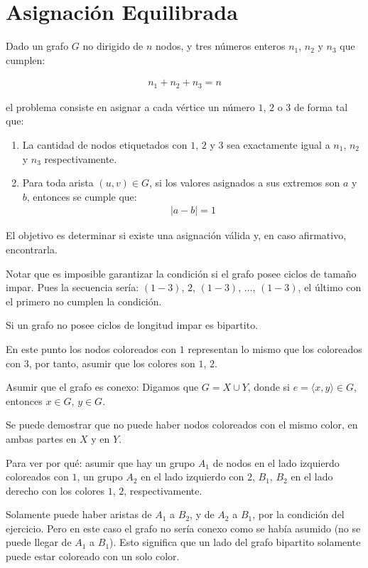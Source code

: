 \documentclass[14pt]{extarticle}
\begin{document}
\section*{Asignación Equilibrada}

Dado un grafo $G$ no dirigido de $n$ nodos, y tres números enteros $n_1$, $n_2$ y $n_3$ que cumplen:

\begin{align}
n_1 + n_2 + n_3 = n
\end{align}

el problema consiste en asignar a cada vértice un número $1$, $2$ o $3$ de forma tal que:

\begin{enumerate}
    \item La cantidad de nodos etiquetados con $1$, $2$ y $3$ sea exactamente igual a $n_1$, $n_2$ y $n_3$ respectivamente.
    \item Para toda arista $(u, v) \in G$, si los valores asignados a sus extremos son $a$ y $b$, entonces se cumple que:
    \begin{align}
    |a - b| = 1
    \end{align}
\end{enumerate}

El objetivo es determinar si existe una asignación válida y, en caso afirmativo, encontrarla.

Notar que es imposible garantizar la condición si el grafo posee ciclos de tamaño impar. Pues la secuencia sería: $(1-3)$, $2$, $(1-3)$, $\ldots$, $(1-3)$, el último con el primero no cumplen la condición.

Si un grafo no posee ciclos de longitud impar es bipartito.

En este punto los nodos coloreados con $1$ representan lo mismo que los coloreados con $3$, por tanto, asumir que los colores son $1$, $2$.

Asumir que el grafo es conexo: Digamos que $G = X \cup Y$, donde si $e = \langle x, y \rangle \in G$, entonces $x \in G$, $y \in G$.

Se puede demostrar que no puede haber nodos coloreados con el mismo color, en ambas partes en $X$ y en $Y$. 

Para ver por qué: asumir que hay un grupo $A_1$ de nodos en el lado izquierdo coloreados con $1$, un grupo $A_2$ en el lado izquierdo con $2$, $B_1$, $B_2$ en el lado derecho con los colores $1$, $2$, respectivamente.

Solamente puede haber aristas de $A_1$ a $B_2$, y de $A_2$ a $B_1$, por la condición del ejercicio. Pero en este caso el grafo no sería conexo como se había asumido (no se puede llegar de $A_1$ a $B_1$). Esto significa que un lado del grafo bipartito solamente puede estar coloreado con un solo color.
\end{document}
